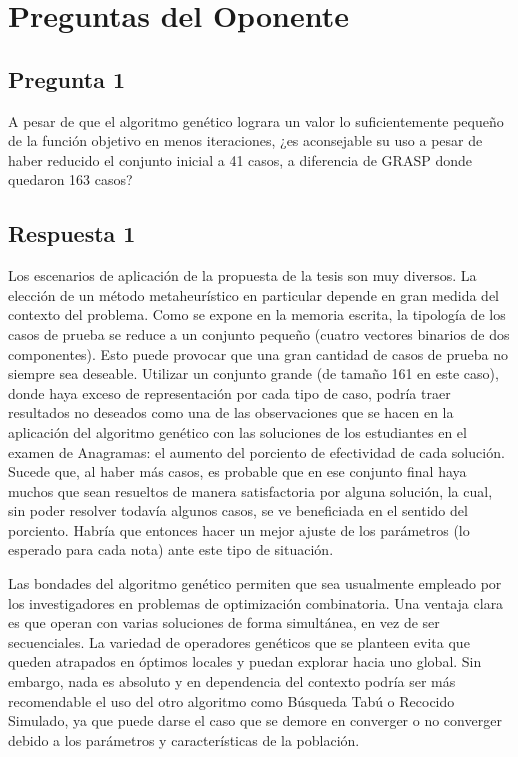 \documentclass[a4paper,11pt]{article}
\begin{document}
	\section*{Preguntas del Oponente}
	
		\subsection*{Pregunta 1}
		A pesar de que el algoritmo genético lograra un valor lo suficientemente pequeño de la función objetivo en menos iteraciones, ¿es aconsejable su uso a pesar de haber reducido el conjunto inicial a 41 casos, a diferencia de GRASP donde quedaron 163 casos?
		
		\subsection*{Respuesta 1}
		Los escenarios de aplicación de la propuesta de la tesis son muy diversos. La elección de un método metaheurístico en particular depende en gran medida del contexto del problema. Como se expone en la memoria escrita, la tipología de los casos de prueba se reduce a un conjunto pequeño (cuatro vectores binarios de dos componentes). Esto puede provocar que una gran cantidad de casos de prueba no siempre sea deseable.
		Utilizar un conjunto grande (de tamaño 161 en este caso), donde haya exceso de representación por cada tipo de caso, podría traer resultados no deseados como una de las observaciones que se hacen en la aplicación del algoritmo genético con las soluciones de los estudiantes en el examen de Anagramas: el aumento del porciento de efectividad de cada solución. Sucede que, al haber más casos, es probable que en ese conjunto final haya muchos que sean resueltos de manera satisfactoria por alguna solución, la cual, sin poder resolver todavía algunos casos, se ve beneficiada en el sentido del porciento. Habría que entonces hacer un mejor ajuste de los parámetros (lo esperado para cada nota) ante este tipo de situación. 
		
		Las bondades del algoritmo genético \cite{ambuludi2018aplicacion} permiten que sea usualmente empleado por los investigadores en problemas de optimización combinatoria. Una ventaja clara es que operan con varias soluciones de forma simultánea, en vez de ser secuenciales. La variedad de operadores genéticos que se planteen evita que queden atrapados en óptimos locales y puedan explorar hacia uno global. Sin embargo, nada es absoluto y en dependencia del contexto podría ser más recomendable el uso del otro algoritmo como Búsqueda Tabú o Recocido Simulado, ya que puede darse el caso que se demore en converger o no converger debido a los parámetros y características de la población.
		
\end{document}
